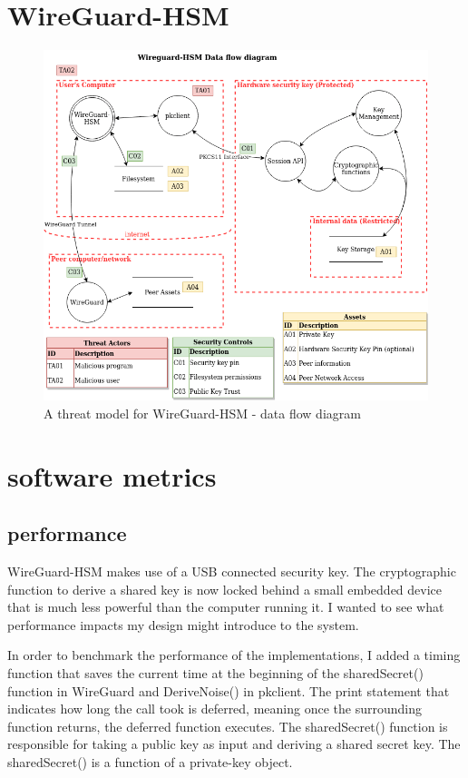 \documentclass [11pt, proquest] {uwthesis}[2020/02/24]
\begin{document}
\section{WireGuard-HSM}
\begin{figure}[ht]
\includegraphics[width=14cm]{paper/images/WGHSM_DFD_preFB.drawio.png}
\caption{A threat model for WireGuard-HSM - data flow diagram}
\label{fig:wg_hsm_dfd}
\end{figure}

\section{software metrics}

\subsection{performance}
WireGuard-HSM makes use of a USB connected security key. The cryptographic function to derive a shared key is now locked behind a small embedded device that is much less powerful than the computer running it. I wanted to see what performance impacts my design might introduce to the system.

In order to benchmark the performance of the implementations, I added a timing function that saves the current time at the beginning of the sharedSecret() function in WireGuard and DeriveNoise() in pkclient. The print statement that indicates how long the call took is deferred, meaning  once the surrounding function returns, the deferred function executes. 
The sharedSecret() function is responsible for taking a public key as input and deriving a shared secret key. The sharedSecret() is a function of a private-key object.
\end{document}
